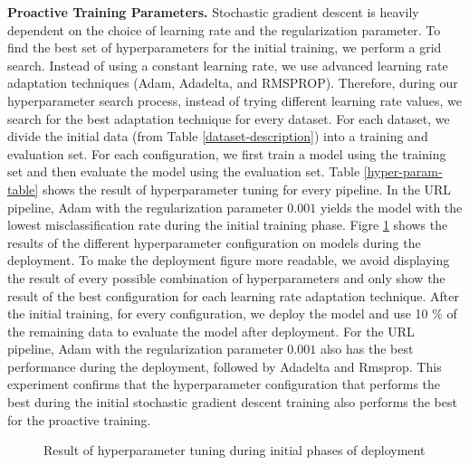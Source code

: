 \textbf{Proactive Training Parameters. }
Stochastic gradient descent is heavily dependent on the choice of learning rate and the regularization parameter.
To find the best set of hyperparameters for the initial training, we perform a grid search.
Instead of using a constant learning rate, we use advanced learning rate adaptation techniques (Adam, Adadelta, and RMSPROP).
Therefore, during our hyperparameter search process, instead of trying different learning rate values, we search for the best adaptation technique for every dataset.
For each dataset, we divide the initial data (from Table \ref{dataset-description}) into a training and evaluation set.
For each configuration, we first train a model using the training set and then evaluate the model using the evaluation set.
Table \ref{hyper-param-table} shows the result of hyperparameter tuning for every pipeline.
In the URL pipeline, Adam with the regularization parameter $0.001$ yields the model with the lowest misclassification rate during the initial training phase.
Figre \ref{hyper-param-figure} shows the results of the different hyperparameter configuration on models during the deployment.
To make the deployment figure more readable, we avoid displaying the result of every possible combination of hyperparameters and only show the result of the best configuration for each learning rate adaptation technique.
After the initial training, for every configuration, we deploy the model and use 10 \% of the remaining data to evaluate the model after deployment.
For the URL pipeline, Adam with the regularization parameter $0.001$ also has the best performance during the deployment, followed by Adadelta and Rmsprop.
This experiment confirms that the hyperparameter configuration that performs the best during the initial stochastic gradient descent training also performs the best for the proactive training.

\begin{figure}[!h]
\centering
\resizebox{\columnwidth}{!}{}
\caption{Result of hyperparameter tuning during initial phases of deployment}
\label{hyper-param-figure}
\end{figure}

